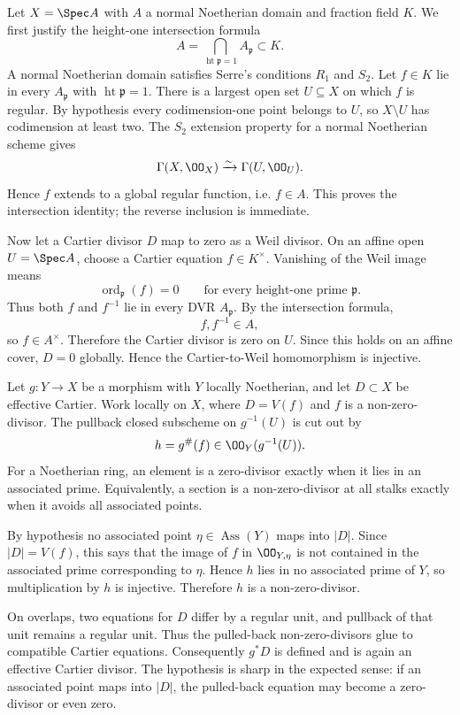 
\begin{solution}
Let \(X=\Spec A\) with \(A\) a normal Noetherian domain and fraction field \(K\).  We first justify the height-one intersection formula
\[
A=\bigcap_{\operatorname{ht}\mathfrak p=1}A_{\mathfrak p}\subset K.
\]
A normal Noetherian domain satisfies Serre's conditions \(R_1\) and \(S_2\).  Let \(f\in K\) lie in every \(A_{\mathfrak p}\) with \(\operatorname{ht}\mathfrak p=1\).  There is a largest open set \(U\subseteq X\) on which \(f\) is regular.  By hypothesis every codimension-one point belongs to \(U\), so \(X\setminus U\) has codimension at least two.  The \(S_2\) extension property for a normal Noetherian scheme gives
\[
\Gamma(X,\OO_X)\xrightarrow{\sim}\Gamma(U,\OO_U).
\]
Hence \(f\) extends to a global regular function, i.e. \(f\in A\).  This proves the intersection identity; the reverse inclusion is immediate.

Now let a Cartier divisor \(D\) map to zero as a Weil divisor.  On an affine open \(U=\Spec A\), choose a Cartier equation \(f\in K^\times\).  Vanishing of the Weil image means
\[
\operatorname{ord}_{\mathfrak p}(f)=0
\qquad
\text{for every height-one prime }\mathfrak p.
\]
Thus both \(f\) and \(f^{-1}\) lie in every DVR \(A_{\mathfrak p}\).  By the intersection formula,
\[
f,f^{-1}\in A,
\]
so \(f\in A^\times\).  Therefore the Cartier divisor is zero on \(U\).  Since this holds on an affine cover, \(D=0\) globally.  Hence the Cartier-to-Weil homomorphism is injective.
\end{solution}

\begin{solution}
Let \(g:Y\to X\) be a morphism with \(Y\) locally Noetherian, and let \(D\subset X\) be effective Cartier.  Work locally on \(X\), where \(D=V(f)\) and \(f\) is a non-zero-divisor.  The pullback closed subscheme on \(g^{-1}(U)\) is cut out by
\[
h=g^\#(f)\in\OO_Y(g^{-1}(U)).
\]
For a Noetherian ring, an element is a zero-divisor exactly when it lies in an associated prime.  Equivalently, a section is a non-zero-divisor at all stalks exactly when it avoids all associated points.

By hypothesis no associated point \(\eta\in\operatorname{Ass}(Y)\) maps into \(|D|\).  Since \(|D|=V(f)\), this says that the image of \(f\) in \(\OO_{Y,\eta}\) is not contained in the associated prime corresponding to \(\eta\).  Hence \(h\) lies in no associated prime of \(Y\), so multiplication by \(h\) is injective.  Therefore \(h\) is a non-zero-divisor.

On overlaps, two equations for \(D\) differ by a regular unit, and pullback of that unit remains a regular unit.  Thus the pulled-back non-zero-divisors glue to compatible Cartier equations.  Consequently \(g^*D\) is defined and is again an effective Cartier divisor.  The hypothesis is sharp in the expected sense: if an associated point maps into \(|D|\), the pulled-back equation may become a zero-divisor or even zero.
\end{solution}

